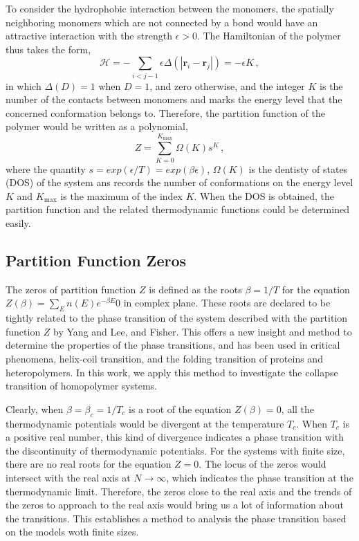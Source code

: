 \documentclass[aps,pre,twocolumn,showpacs,preprintnumbers,amsmath,amssymb]{revtex4-1}
\begin{document}
To consider the hydrophobic interaction between the monomers, the spatially
neighboring monomers which are not connected by a bond would have an attractive
interaction with the strength $\epsilon>0$. The Hamiltonian of the polymer thus
takes the form,
\begin{equation}
{\mathcal H}=-\sum_{i<j-1}\epsilon \Delta(|{\mathbf r}_i-{\mathbf r}_j|)=
-\epsilon K \, ,
\end{equation}
in which $\Delta(D)=1$ when $D=1$, and zero otherwise, and the integer $K$
is the number of the contacts between monomers and marks the energy level
that the concerned conformation belongs to. Therefore, the partition
function of the polymer would be written as a polynomial,
\begin{equation}
Z=\sum_{K=0}^{K_{\text{max}}} \Omega(K) s^K \, ,
\end{equation}
where the quantity $s=exp(\epsilon/T)=exp(\beta\epsilon)$, $\Omega(K)$ is the dentisty
of states (DOS) of the system ans records the number 
of conformations on the energy level $K$ and $K_{\text{max}}$ is the
maximum of the index $K$. When the DOS is obtained, the partition function and
the related thermodynamic functions could be determined easily.

\subsection{Partition Function Zeros}

The zeros of partition function $Z$ is defined as the roots $\beta=1/T$
for the equation $Z(\beta)=\sum_E n(E)e^{-\beta E}0$ in complex plane. These
roots are declared to be
tightly related to the phase transition of the system described with the
partition function $Z$ by Yang and Lee, and Fisher. This offers a new insight
and method to determine the properties of the phase transitions, and has been
used in critical phenomena, helix-coil transition, and the folding transition of
proteins and heteropolymers. In this work, we apply this method to investigate
the collapse transition of homopolymer systems.

Clearly, when $\beta=\beta_c=1/T_c$ is a root of the equation $Z(\beta)=0$, all
the thermodynamic potentials would be divergent at the temperature $T_c$. When
$T_c$ is a positive real number, this kind of divergence indicates a phase
transition with the discontinuity of thermodynamic potentiaks. For the systems
with finite size, there are no real roots for the equation $Z=0$. The locus of
the zeros would intersect with the real axis at $N\rightarrow\infty$, which
indicates the phase transition at the thermodynamic limit. Therefore, the zeros
close to the real axis and the trends of the zeros to approach to the real axis
would bring us a lot of information about the transitions. This establishes a
method to analysis the phase transition based on the models woth finite sizes.
\end{document}
